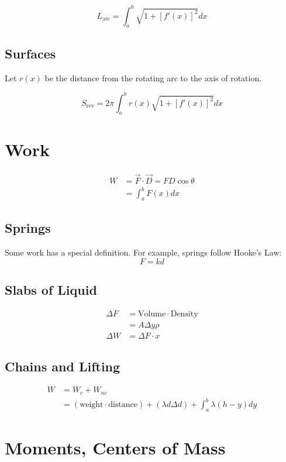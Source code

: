 \begin{equation}
  L_{\text{arc}} = \int_a^b \sqrt{1+[f'(x)]^2} dx
\end{equation}

\subsection{Surfaces}
Let $r(x)$ be the distance from the rotating arc to the axis of rotation.

\begin{equation}
  S_{\text{rev}} = 2\pi\int_a^b r(x)\sqrt{1+[f'(x)]^2} dx
\end{equation}

\section{Work}
\begin{align}
  W &= \vec{F}\cdot{\vec{D}}=FD\cos\theta \\
    &= \int_a^b F(x) dx
\end{align}

\subsection{Springs}
Some work has a special definition. For example, springs follow Hooke's Law:
\begin{equation}
  F=kd
\end{equation}

\subsection{Slabs of Liquid}
\begin{align}
  \Delta F &= \text{Volume} \cdot \text{Density} \\
           &= A\Delta{y}\rho \\
  \Delta W &= \Delta{F}\cdot x
\end{align}

\subsection{Chains and Lifting}
\begin{align}
  W &= W_c + W_{nc} \\
    &= (\text{weight}\cdot\text{distance}) + (\lambda{d}\Delta{d}) + \int_a^b
  \lambda(h-y) dy
\end{align}

\section{Moments, Centers of Mass}
